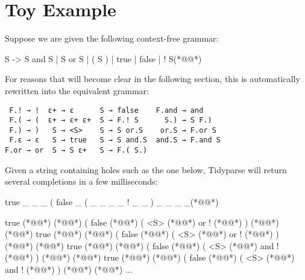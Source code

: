 \documentclass[sigplan,review,anonymous,acmsmall]{acmart}\settopmatter{printfolios=false,printccs=false,printacmref=false}
\begin{document}
%

    \section{Toy Example}

    Suppose we are given the following context-free grammar:

\begin{tidyinput}
S -> S and S | S or S | ( S ) | true | false | ! S(*@\caret{ }@*)
\end{tidyinput}

    \noindent For reasons that will become clear in the following section, this is automatically rewritten into the equivalent grammar:

    \begin{verbatim}
 F.! → !  ε+ → ε      S → false    F.and → and
 F.( → (  ε+ → ε+ ε+  S → F.! S      S.) → S F.)
 F.) → )   S → <S>    S → S or.S    or.S → F.or S
 F.ε → ε   S → true   S → S and.S  and.S → F.and S
F.or → or  S → S ε+   S → F.( S.)
    \end{verbatim}

%

    \noindent Given a string containing holes such as the one below, Tidyparse will return several completions in a few milliseconds:

\begin{tidyinput}
true _ _ _ ( false _ ( _ _ _ _ ! _ _ ) _ _ _ _(*@\caret{ }@*)
\end{tidyinput}

\begin{tidyoutput}
true (*@@*) (*@\hlorange{!}@*) ( false (*@@*) ( <S> (*@\hlorange{)}@*) or ! (*@@*) ) (*@@*) (*@@*)
true (*@@*) (*@\hlorange{!}@*) ( false (*@@*) ( <S> (*@\hlorange{)}@*) or ! (*@@*) ) (*@@*) (*@@*)
true (*@@*) (*@\hlorange{!}@*) ( false (*@@*) ( <S> (*@\hlorange{)}@*) and ! (*@@*) ) (*@@*) (*@@*)
true (*@@*) (*@\hlorange{!}@*) ( false (*@@*) ( <S> (*@\hlorange{)}@*) and ! (*@@*) ) (*@@*) (*@@*)
...
\end{tidyoutput}
\end{document}
